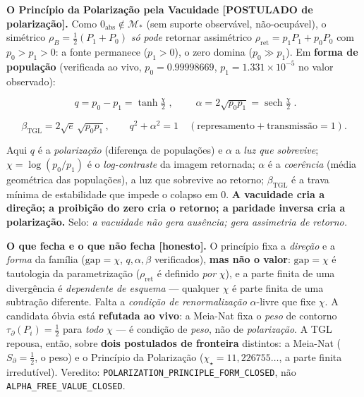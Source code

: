 \documentclass[11pt]{article}
\theoremstyle{definition}\newtheorem{deriv}{Derivação}
\begin{document}
\textbf{O Princípio da Polarização pela Vacuidade \textsf{[POSTULADO de polarização]}.} Como $0_{\mathrm{abs}}\notin\mathcal M_*$ (sem suporte observável, não-ocupável), o simétrico $\rho_B=\tfrac12(P_1+P_0)$ \emph{só pode} retornar assimétrico $\rho_{\mathrm{ret}}=p_1P_1+p_0P_0$ com $p_0>p_1>0$: a fonte permanece ($p_1>0$), o zero domina ($p_0\gg p_1$). Em \textbf{forma de população} (verificada ao vivo, $p_0=0.99998669$, $p_1=1.331\times10^{-5}$ no valor observado):

\begin{equation}\boxed{\;q=p_0-p_1=\tanh\tfrac\chi2\;},\qquad \boxed{\;\alpha=2\sqrt{p_0p_1}=\operatorname{sech}\tfrac\chi2\;}.\end{equation}

\begin{equation}\beta_{\mathrm{TGL}}=2\sqrt e\,\sqrt{p_0p_1},\qquad q^2+\alpha^2=1\quad(\text{represamento}+\text{transmissão}=1).\end{equation}

Aqui $q$ é a \emph{polarização} (diferença de populações) e $\alpha$ a \emph{luz que sobrevive}; $\chi=\log(p_0/p_1)$ é o \emph{log-contraste} da imagem retornada; $\alpha$ é a \emph{coerência} (média geométrica das populações), a luz que sobrevive ao retorno; $\beta_{\mathrm{TGL}}$ é a trava mínima de estabilidade que impede o colapso em $0$. \textbf{A vacuidade cria a direção; a proibição do zero cria o retorno; a paridade inversa cria a polarização.} Selo: \emph{a vacuidade não gera ausência; gera assimetria de retorno.}

\textbf{O que fecha e o que não fecha \textsf{[honesto]}.} O princípio fixa a \emph{direção} e a \emph{forma} da família ($\mathrm{gap}=\chi$, $q,\alpha,\beta$ verificados), \textbf{mas não o valor}: $\mathrm{gap}=\chi$ é tautologia da parametrização ($\rho_{\mathrm{ret}}$ é definido \emph{por} $\chi$), e a parte finita de uma divergência é \emph{dependente de esquema} --- qualquer $\chi$ é parte finita de uma subtração diferente. Falta a \emph{condição de renormalização} $\alpha$-livre que fixe $\chi$. A candidata óbvia está \textbf{refutada ao vivo}: a Meia-Nat fixa o \emph{peso} de contorno $\tau_\partial(P_i)=\tfrac12$ para \emph{todo} $\chi$ --- é condição de \emph{peso}, não de \emph{polarização}. A TGL repousa, então, sobre \textbf{dois postulados de fronteira} distintos: a Meia-Nat ($S_\partial=\tfrac12$, o peso) e o Princípio da Polarização ($\chi_\star=11{,}226755\ldots$, a parte finita irredutível). Veredito: \texttt{POLARIZATION\_PRINCIPLE\_FORM\_CLOSED}, não \texttt{ALPHA\_FREE\_VALUE\_CLOSED}.
\end{document}
